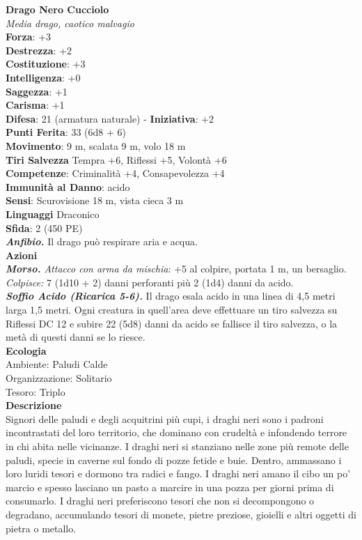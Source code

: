 \begin{multicols}{2}
\medskip\textbf{Drago Nero Cucciolo}\\
\emph{Media drago, caotico malvagio}\\
\textbf{Forza}: +3\\
\textbf{Destrezza}: +2\\
\textbf{Costituzione}: +3\\
\textbf{Intelligenza}: +0\\
\textbf{Saggezza}: +1\\
\textbf{Carisma}: +1\\
\textbf{Difesa}: 21 (armatura naturale) - \textbf{Iniziativa}: +2\\
\textbf{Punti Ferita}: 33 (6d8 + 6)\\
\textbf{Movimento}: 9 m, scalata 9 m, volo 18 m\\
\textbf{Tiri Salvezza} Tempra +6, Riflessi +5, Volontà +6\\
\textbf{Competenze}: Criminalità +4, Consapevolezza +4\\
\textbf{Immunità al Danno}: acido\\
\textbf{Sensi}: Scurovisione 18 m, vista cieca 3 m\\
\textbf{Linguaggi} Draconico\\
\textbf{Sfida}: 2 (450 PE)\smallskip\\
\emph{\textbf{Anfibio.}} Il drago può respirare aria e acqua.\\
\smallskip\textbf{Azioni}\\
\emph{\textbf{Morso.} Attacco con arma da mischia}: +5 al colpire, portata 1 m, un bersaglio.\\
\emph{Colpisce:} 7 (1d10 + 2) danni perforanti più 2 (1d4) danni da acido.\\
\emph{\textbf{Soffio Acido (Ricarica 5-6).}} Il drago esala acido in una linea di 4,5 metri larga 1,5 metri. Ogni creatura in quell'area deve effettuare un tiro salvezza su Riflessi DC  12 e subire 22 (5d8) danni da acido se fallisce il tiro salvezza, o la metà di questi danni se lo riesce.\\
\textbf{Ecologia}\\
Ambiente: Paludi Calde\\
Organizzazione: Solitario\\
Tesoro: Triplo\\
\textbf{Descrizione}\\
Signori delle paludi e degli acquitrini più cupi, i draghi neri sono i padroni incontrastati del loro territorio, che dominano con crudeltà e infondendo terrore in chi abita nelle vicinanze. I draghi neri si stanziano nelle zone più remote delle paludi, specie in caverne sul fondo di pozze fetide e buie. Dentro, ammassano i loro luridi tesori e dormono tra radici e fango. I draghi neri amano il cibo un po’ marcio e spesso lasciano un pasto a marcire in una pozza per giorni prima di consumarlo. I draghi neri preferiscono tesori che non si decompongono o degradano, accumulando tesori di monete, pietre preziose, gioielli e altri oggetti di pietra o metallo.\\


\end{multicols}
